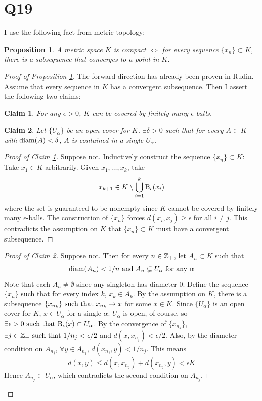 \documentclass[12pt]{article}
\newtheorem{claim}{Claim}
\newtheorem{proposition}{Proposition}
\begin{document}
\section*{Q19} 
I use the following fact from metric topology:
\begin{proposition} \label{prop:cpct}
  A metric space $K$ is compact $\iff$ for every sequence $\{x_n\} \subset K$, there is a subsequence that converges to a point in $K$.  
\end{proposition}
\begin{proof}[Proof of Proposition \ref{prop:cpct}] 
  The forward direction has already been proven in Rudin. 
  Assume that every sequence in $K$ has a convergent subsequence.  
  Then I assert the following two claims: 

  \begin{claim}\label{claim:balls}
    For any $\epsilon > 0$, $K$ can be covered by finitely many $\epsilon$-balls. 
  \end{claim}

  \begin{claim} \label{claim:diam}
    Let $\{U_\alpha\}$ be an open cover for $K$. 
    $\exists \delta > 0$ such that for every $A \subset K$ with $\text{diam}(A) < \delta$, $A$ is contained in a single $U_\alpha$. 
  \end{claim}

  \begin{proof}[Proof of Claim \ref{claim:balls}] 
    Suppose not. 
    Inductively construct the sequence $\{x_n\} \subset K$: 
    Take $x_1 \in K$ arbitrarily. 
    Given $x_1, \ldots, x_k$, take 
    $$x_{k + 1} \in K \setminus \bigcup_{i = 1}^{k} \text{B}_{\epsilon}(x_i)$$
    where the set is guaranteed to be nonempty since $K$ cannot be covered by finitely many $\epsilon$-balls. 
    The construction of $\{x_n\}$ forces $d(x_i, x_j) \geq \epsilon$ for all $i \neq j$. 
    This contradicts the assumption on $K$ that $\{x_n\} \subset K$ must have a convergent subsequence.
  \end{proof}

  \begin{proof}[Proof of Claim \ref{claim:diam}]
    Suppose not. 
    Then for every $n \in \mathbb{Z}_{+}$, let $A_n \subset K$ such that 
    $$\text{diam}(A_n) < 1/n \text{ and } A_n \subsetneq U_\alpha \text{ for any } \alpha$$
    Note that each $A_n \neq \emptyset$ since any singleton has diameter 0. 
    Define the sequence $\{x_n\}$ such that for every index $k$, $x_k \in A_k$. 
    By the assumption on $K$, there is a subsequence $\{x_{n_k}\} \text{ such that } x_{n_k} \rightarrow x$ for some $x \in K$. 
    Since $\{U_\alpha\}$ is an open cover for $K$, $x \in U_\alpha$ for a single $\alpha$. 
    $U_\alpha$ is open, of course, so $\exists \epsilon > 0 \text{ such that } \text{B}_{\epsilon}(x) \subset U_\alpha$. 
    By the convergence of $\{x_{n_k}\}$, $\exists j \in \mathbb{Z}_{+} \text{ such that } 1/n_j < \epsilon / 2$ and $d(x, x_{n_j}) < \epsilon / 2$. 
    Also, by the diameter condition on $A_{n_j}$, $\forall y \in A_{n_j}$, $d(x_{n_j}, y) < 1 / n_j$. 
    This means 
    $$d(x, y) \leq d(x, x_{n_j}) + d(x_{n_j}, y) < \epsilon K$$ 
    Hence $A_{n_j} \subset U_\alpha$, which contradicts the second condition on $A_{n_j}$. 
  \end{proof}


\end{proof}
\end{document}
